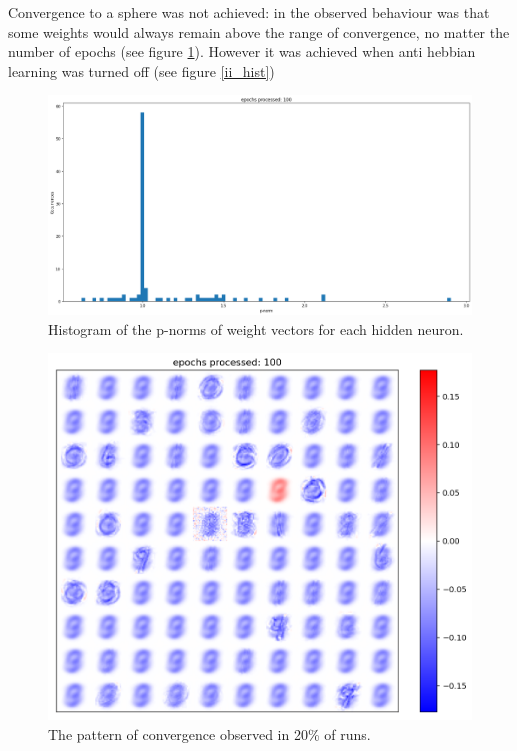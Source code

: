 \documentclass[a4paper]{report}
\begin{document}
 Convergence to a sphere was not achieved: in the observed behaviour was that some weights would always remain above the range of convergence, no matter the number of epochs (see figure \ref{uu_hist}). However it was achieved when anti hebbian learning was turned off (see figure \ref{ii_hist})
\begin{figure} [H]
    \centering
    \includegraphics [width=12cm ] {o/uu_hist.png}
    \caption{Histogram of the p-norms of weight vectors for each hidden neuron.}
    \label{uu_hist}
\end{figure}

\begin{figure} [H]
    \centering
    \includegraphics [width=12cm ] {h/nove.png}
    \caption{The pattern of convergence observed in 20\% of runs.}
    \label{nove}
\end{figure}
\end{document}

